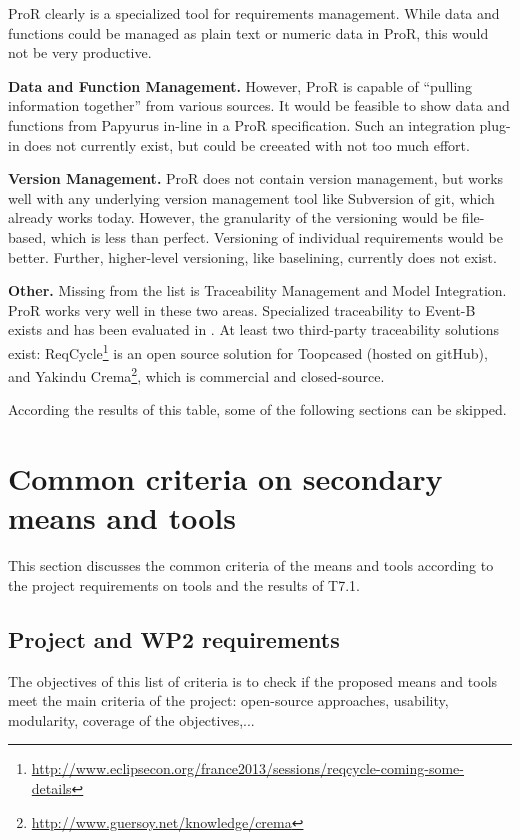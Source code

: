 \begin{author_comment}
ProR clearly is a specialized tool for requirements management.  While data and functions could be managed as plain text or numeric data in ProR, this would not be very productive.

\textbf{Data and Function Management.} However, ProR is capable of ``pulling information together'' from various sources.  It would be feasible to show data and functions from Papyurus in-line in a ProR specification.  Such an integration plug-in does not currently exist, but could be creeated with not too much effort.

\textbf{Version Management.} ProR does not contain version management, but works well with any underlying version management tool like Subversion of git, which already works today.  However, the granularity of the versioning would be file-based, which is less than perfect.  Versioning of individual requirements would be better.  Further, higher-level versioning, like baselining, currently does not exist.

\textbf{Other.} Missing from the list is Traceability Management and Model Integration.  ProR works very well in these two areas.  Specialized traceability to Event-B exists and has been evaluated in \cite{event_b_benchmark}.  At least two third-party traceability solutions exist: ReqCycle\footnote{\url{http://www.eclipsecon.org/france2013/sessions/reqcycle-coming-some-details}} is an open source solution for Toopcased (hosted on gitHub), and Yakindu Crema\footnote{\url{http://www.guersoy.net/knowledge/crema}}, which is commercial and closed-source.
\end{author_comment}

According the results of this table, some of the following sections can be skipped.

\section{Common criteria on secondary means and tools}
\label{common}
This section discusses the common criteria of the means and tools according to the project requirements on tools and the results of T7.1.

\subsection{Project and WP2 requirements}

The objectives of this list of criteria is to check if the proposed means and tools meet the main criteria of the project: open-source approaches, usability, modularity, coverage of the objectives,...

